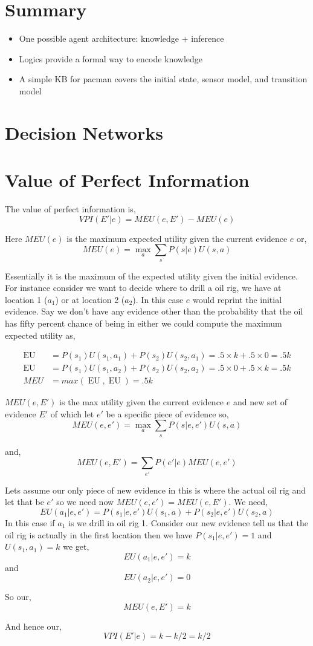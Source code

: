  \section{Summary}
 \begin{itemize}
     \item One possible agent architecture: knowledge + inference
     \item Logics provide a formal way to encode knowledge
     \item A simple KB for pacman covers the initial state, sensor model, and transition model
 \end{itemize}


\section{Decision Networks}


\section{Value of Perfect Information}
The value of perfect information is, 
$$ VPI(E'|e) = MEU(e,E') - MEU(e) $$ 

Here $MEU(e)$ is the maximum expected utility given the current evidence $e$ or,
$$ MEU(e) = \mathop{max}_a \sum_s P(s|e) U(s,a) $$ 

Essentially it is the maximum of the expected utility given the initial evidence. For instance consider we want to decide where to drill a oil rig, we have at location 1 ($a_1$) or at location 2 ($a_2$). In this case $e$ would reprint the initial evidence. Say we don't have any evidence other than the probability that the oil has fifty percent chance of being in either  we could compute the maximum expected utility as, 

\begin{align*}
    \mathop{EU(a_1)} &= P(s_1)U(s_1,a_1) + P(s_2)U(s_2,a_1) = .5 \times k + .5 \times 0 = .5k\\
    \mathop{EU(a_2)} &= P(s_1)U(s_1,a_2) + P(s_2)U(s_2,a_2) = .5 \times  0 + .5 \times  k = .5k\\
    MEU &= max( \mathop{EU(a_1)}, \mathop{EU(a_2)}) = .5k
\end{align*}



$MEU(e, E')$ is the max utility given the current evidence  $e$ and new set of evidence $E'$ of which let $e'$ be a specific piece of evidence so,
$$ MEU(e, e') = \mathop{max}_{a} \sum_s P(s |e,e') U(s,a) $$ 

and, 
$$ MEU(e, E') = \sum_{e'} P(e'|e)MEU(e,e')$$

Lets assume our only piece of new evidence in this is where the actual oil rig and let that be $e'$ so we need now $MEU(e,e') = MEU(e,E')$. We need, 
$$ EU(a_1 | e,e') = P(s_1 | e,e')U(s_1,a) + P(s_2 | e,e')U(s_2,a) $$ 
In this case if $a_1$ is we drill in oil rig 1. Consider our new evidence tell us that the oil rig is actually in the first location then we have $P(s_1 | e,e') = 1$ and $U(s_1,a_1) = k$ we get, 
$$ EU(a_1 | e,e') = k $$  and 
$$ EU(a_2 | e,e') = 0 $$ 

So our, 
$$ MEU(e,E') =k $$ 

And hence our, 
$$ VPI(E'|e) = k - k /2 = k /2 $$ 
